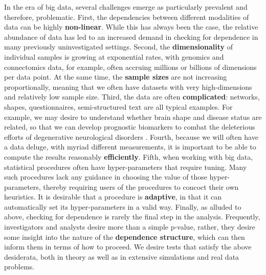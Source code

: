 \documentclass[11pt]{article}
\begin{document}
In the era of big data, several challenges emerge as particularly prevalent and therefore, problematic.
%
First, the dependencies between different modalities of data can be highly \textbf{non-linear}.  While this has always been the case, the relative abundance of data has led to an increased demand in checking for dependence in many previously uninvestigated settings.
%
Second, the \textbf{dimensionality} of individual samples is growing at exponential rates, with genomics and connectomics data, for example, often accruing millions or billions of dimensions per data point. At the same time, the \textbf{sample sizes} are not increasing proportionally, meaning that we often have datasets with very high-dimensions and relatively low sample size.
%
Third, the data are often \textbf{complicated}: networks, shapes, questionnaires, semi-structured text are all typical examples.
For example, we may desire to understand whether brain shape and disease status are related, so that we can develop prognostic biomarkers to combat the deleterious efforts of degenerative neurological disorders \cite{ParkEtAl2008}.
%
%
Fourth, because we will often have a data deluge, with myriad different measurements, it is important to be able to compute the results reasonably \textbf{efficiently}.
%
Fifth, when working with big data, statistical procedures often have hyper-parameters that require tuning.  Many such procedures lack any guidance in choosing the value of those hyper-parameters, thereby requiring users of the procedures to concoct their own heuristics. It is desirable that a procedure is \textbf{adaptive}, in that it can automatically set its hyper-parameters in a valid way.
%
Finally, as alluded to above, checking for dependence is rarely the final step in the analysis.  Frequently, investigators and analysts desire more than a simple p-value, rather, they desire some insight into the nature of the \textbf{dependence structure}, which can then inform them in terms of how to proceed.
%
We desire tests that satisfy the above desiderata, both in theory as well as in extensive simulations and real data problems.
\end{document}
